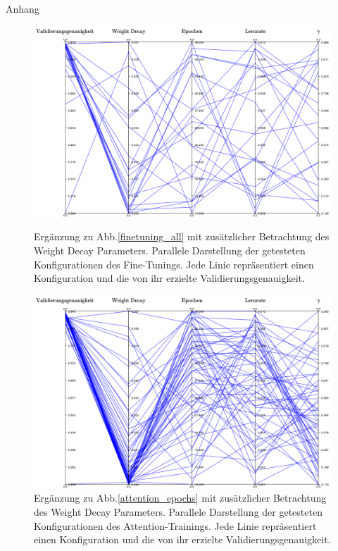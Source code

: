 \newpage
\pagestyle{empty}
\vspace*{7cm}
\begin{center}
{\Huge Anhang}
\end{center}
\newpage
\pagestyle{fancy}
\setcounter{figure}{0}
\renewcommand{\thefigure}{\Roman{figure}}


\begin{figure}[h]
\centering
\includegraphics[scale=0.52]{NNOPT/Anhang/layer3_with_weigth_decay_finetuning}
\caption{Ergänzung zu Abb.\ref{finetuning_all} mit zusätzlicher Betrachtung des Weight Decay Parameters. Parallele Darstellung der getesteten Konfigurationen des Fine-Tunings. Jede Linie repräsentiert einen Konfiguration und die von ihr erzielte Validierungsgenauigkeit.}
\label{weight_decay_1}
\includegraphics[scale=0.52]{NNOPT/Anhang/layer3_with_weigth_decay_attention}
\caption{Ergänzung zu Abb.\ref{attention_epochs} mit zusätzlicher Betrachtung des Weight Decay Parameters. Parallele Darstellung der getesteten Konfigurationen des Attention-Trainings. Jede Linie repräsentiert einen Konfiguration und die von ihr erzielte Validierungsgenauigkeit.}
\label{weight_decay_2}
\end{figure}

